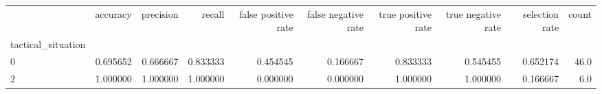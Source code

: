 \begin{tabular}{lrrrrrrrrr}
\toprule
{} &  accuracy &  precision &    recall &  false positive rate &  false negative rate &  true positive rate &  true negative rate &  selection rate &  count \\
tactical\_situation &           &            &           &                      &                      &                     &                     &                 &        \\
\midrule
0                  &  0.695652 &   0.666667 &  0.833333 &             0.454545 &             0.166667 &            0.833333 &            0.545455 &        0.652174 &   46.0 \\
2                  &  1.000000 &   1.000000 &  1.000000 &             0.000000 &             0.000000 &            1.000000 &            1.000000 &        0.166667 &    6.0 \\
\bottomrule
\end{tabular}
